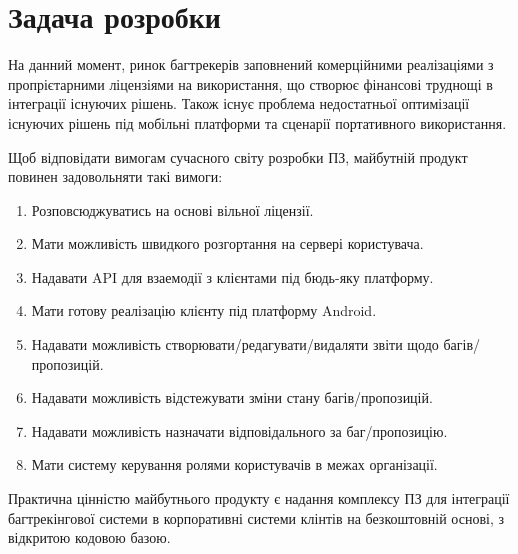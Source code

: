 \documentclass[../main.tex]{subfiles}
\begin{document}
\section{Задача розробки}

На данний момент, ринок багтрекерів заповнений комерційними реалізаціями з пропрієтарними ліцензіями на використання, що створює фінансові труднощі в інтеграції існуючих рішень. Також існує проблема недостатньої оптимізації існуючих рішень під мобільні платформи та сценарії портативного використання.

Щоб відповідати вимогам сучасного світу розробки ПЗ, майбутній продукт повинен задовольняти такі вимоги:
\begin{enumerate}
    \item Розповсюджуватись на основі вільної ліцензії.
    \item Мати можливість швидкого розгортання на сервері користувача.
    \item Надавати API для взаемодії з клієнтами під бюдь-яку платформу.
    \item Мати готову реалізацію клієнту під платформу Android.
    \item Надавати можливість створювати/редагувати/видаляти звіти щодо багів/пропозицій.
    \item Надавати можливість відстежувати зміни стану багів/пропозицій.
    \item Надавати можливість назначати відповідального за баг/пропозицію.
    \item Мати систему керування ролями користувачів в межах організації.
\end{enumerate}

Практична цінністю майбутнього продукту є надання комплексу ПЗ для інтеграції багтрекінгової системи в корпоративні системи клінтів на безкоштовній основі, з відкритою кодовою базою.
\end{document}
